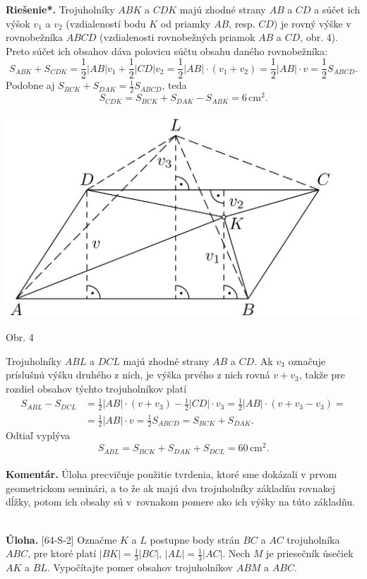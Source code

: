 \documentclass[11pt,a4paper,oneside,final]{book}
\newcommand{\kom}{\textbf{Komentár.} }
\newcommand{\ul}{\textbf{Úloha.} }
\newcommand{\rieh}{\textbf{Riešenie*.} }
\begin{document}
\rieh Trojuholníky $ABK$ a $CDK$ majú zhodné strany $AB$ a $CD$ a súčet ich výšok $v_1$ a $v_2$ (vzdialeností bodu $K$ od priamky $AB$, resp. $CD$) je rovný výške v rovnobežníka $ABCD$ (vzdialenosti rovnobežných priamok $AB$ a $CD$, obr. 4). Preto súčet ich obsahov dáva polovicu súčtu obsahu daného rovnobežníka:
$$S_{ABK} + S_{CDK} = \frac{1}{2} |AB|v_1 +\frac{1}{2} |CD|v_2 = \frac{1}{2}|AB| \cdot (v_1 + v_2 ) =\frac{1}{2}|AB| \cdot v =\frac{1}{2} S_{ABCD}.$$
Podobne aj $S_{BCK} + S_{DAK} =\frac{1}{2} S_{ABCD}$, teda
$$S_{CDK} = S_{BCK} + S_{DAK} - S_{ABK}= 6\,\text{cm}^2.$$
\begin{center}
\includegraphics[scale=0.3]{62K2}

Obr. 4
\end{center}
Trojuholníky $ABL$ a $DCL$ majú zhodné strany $AB$ a $CD$. Ak $v_3$ označuje príslušnú výšku druhého z nich, je výška prvého z nich rovná $v + v_3$, takže pre rozdiel obsahov týchto trojuholníkov platí
\begin{align*}
S_{ABL} - S_{DCL} &= \frac{1}{2} |AB| \cdot (v + v_3 ) - \frac{1}{2}|CD|\cdot v_3 =\frac{1}{2} |AB| \cdot (v + v_3 - v_3 ) =\\
&= \frac{1}{2} |AB| \cdot v = \frac{1}{2} S_{ABCD} = S_{BCK} + S_{DAK}.
\end{align*}
Odtiaľ vyplýva
$$S_{ABL} = S_{BCK} + S_{DAK} + S_{DCL} = 60\,\text{cm}^2.$$
\\
\kom Úloha precvičuje použitie tvrdenia, ktoré sme dokázali v prvom geometrickom seminári, a to že ak majú dva trojuholníky základňu rovnakej dĺžky, potom ich obsahy sú v~rovnakom pomere ako ich výšky na túto základňu.\\
\\
\begin{tcolorbox}[breakable,notitle,boxrule=0pt,colback=light-gray,colframe=light-gray]\ul [64-S-2] Označme $K$ a $L$ postupne body strán $BC$ a $AC$ trojuholníka $ABC$, pre ktoré platí $|BK|= \frac{1}{3}|BC|$, $|AL| =\frac{1}{3}|AC|$. Nech $M$ je priesečník úsečiek $AK$ a $BL$. Vypočítajte pomer obsahov trojuholníkov $ABM$ a $ABC$.

\end{tcolorbox}
\end{document}
